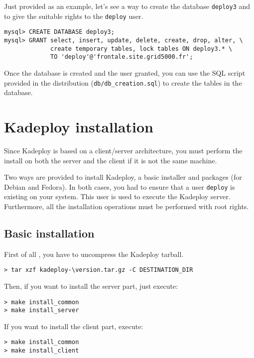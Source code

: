 \documentclass[a4wide,10pt,oneside]{book}
\newcommand{\version}{3.1.7}
\begin{document}
Just provided as an example, let's see a way to create the database \texttt{deploy3} and to give the suitable rights to the \texttt{deploy} user.
\begin{verbatim}
mysql> CREATE DATABASE deploy3;
mysql> GRANT select, insert, update, delete, create, drop, alter, \
             create temporary tables, lock tables ON deploy3.* \
             TO 'deploy'@'frontale.site.grid5000.fr';
\end{verbatim}

Once the database is created and the user granted, you can use the SQL script provided in the distribution (\texttt{db/db\_creation.sql}) to create the tables in the database.

\section{Kadeploy installation}
Since Kadeploy is based on a client/server architecture, you must perform the install on both the server and the client if it is not the same machine.

Two ways are provided to install Kadeploy, a basic installer and packages (for Debian and Fedora). In both cases, you had to ensure that a user \texttt{deploy} is existing on your system. This user is used to execute the Kadeploy server. Furthermore, all the installation operations must be performed with root rights.

\subsection{Basic installation}
First of all , you have to uncompress the Kadeploy tarball.
\begin{small}
\begin{Verbatim}[commandchars=\\\{\}]
> tar xzf kadeploy-\version.tar.gz -C DESTINATION_DIR
\end{Verbatim}
\end{small}

\noindent Then, if you want to install the server part, just execute:
\begin{small}
\begin{verbatim}
> make install_common
> make install_server
\end{verbatim}
\end{small}

\noindent If you want to install the client part, execute:
\begin{small}
\begin{verbatim}
> make install_common
> make install_client
\end{verbatim}
\end{small}
\end{document}
